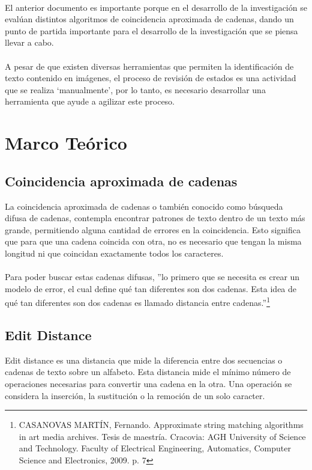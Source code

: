 \paragraph{}
El anterior documento es importante porque en el desarrollo de la 
investigaci\'on se eval\'uan distintos algoritmos de coincidencia aproximada
de cadenas, dando un punto de partida importante para el desarrollo de 
la investigaci\'on que se piensa llevar a cabo.
\paragraph{}
A pesar de que existen diversas herramientas que permiten la identificaci\'on
de texto contenido en im\'agenes, el proceso de revisi\'on de estados es 
una actividad que se realiza ‘manualmente’, por lo tanto, es necesario 
desarrollar una herramienta que ayude a agilizar este proceso.

\section{Marco Te\'orico}
\subsection{Coincidencia aproximada de cadenas}
La coincidencia aproximada de cadenas o tambi\'en conocido como b\'usqueda 
difusa de cadenas, contempla encontrar patrones de texto dentro de un 
texto m\'as grande, permitiendo alguna cantidad de errores en la coincidencia.
Esto significa que para que una cadena coincida con otra, no es necesario
que tengan la misma longitud ni que coincidan exactamente todos los 
caracteres.
\paragraph{}
Para poder buscar estas cadenas difusas, 
''lo primero que se necesita es crear un modelo de error, el cual define qu\'e tan diferentes son dos cadenas. Esta idea de qu\'e tan diferentes son dos cadenas es llamado distancia entre cadenas.''\footnote{CASANOVAS MART\'IN, Fernando. Approximate string matching algorithms in art media archives.
Tesis de maestr\'ia. Cracovia:  AGH University of Science and Technology.
Faculty of Electrical Engineering, Automatics, Computer Science and Electronics, 2009. p. 7}

\subsection{Edit Distance}
Edit distance es una distancia que mide la diferencia entre dos 
secuencias o cadenas de texto sobre un alfabeto. Esta distancia mide el
m\'inimo n\'umero de operaciones necesarias para convertir una cadena en la
otra. Una operaci\'on se considera la inserci\'on, la sustituci\'on o la 
remoci\'on de un solo caracter.

